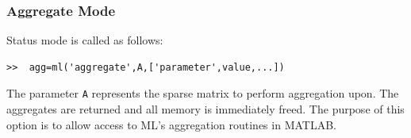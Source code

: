 \documentclass{article}[11pt]
\begin{document}
\subsubsection{Aggregate Mode}
Status mode is called as follows:
\begin{verbatim}
>>  agg=ml('aggregate',A,['parameter',value,...])
\end{verbatim}
The parameter \texttt{A} represents the sparse matrix to perform
aggregation upon.  The aggregates are returned and all memory is
immediately freed.  The purpose of this option is to allow access to
ML's aggregation routines in MATLAB.





\end{document}
